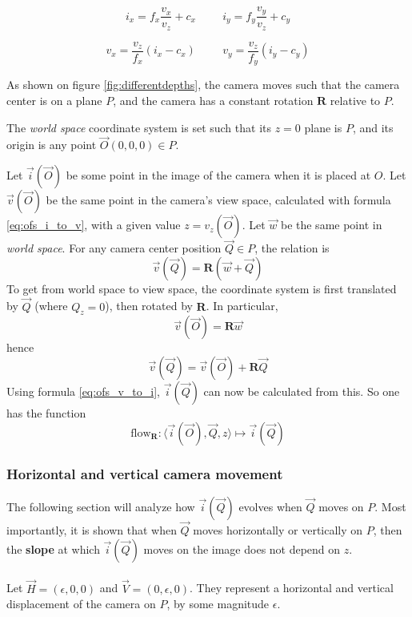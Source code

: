 \documentclass{scrreprt}
\newcommand{\matr}[1]{\mathbf{#1}}
\begin{document}
\begin{equation}
\label{eq:ofs_v_to_i}
i_x = f_x \frac{v_x}{v_z} + c_x
\hspace{1cm}
i_y = f_y \frac{v_y}{v_z} + c_y
\end{equation}

\begin{equation}
\label{eq:ofs_i_to_v}
v_x = \frac{v_z}{f_x} (i_x - c_x)
\hspace{1cm}
v_y = \frac{v_z}{f_y} (i_y - c_y)
\end{equation}

As shown on figure \ref{fig:differentdepths}, the camera moves such that the camera center is on a plane $P$, and the camera has a constant rotation $\matr{R}$ relative to $P$.

The \emph{world space} coordinate system is set such that its $z = 0$ plane is $P$, and its origin is any point $\vec{O}(0,0,0) \in P$.

Let $\vec{i}(\vec{O})$ be some point in the image of the camera when it is placed at $O$. Let $\vec{v}(\vec{O})$ be the same point in the camera's view space, calculated with formula \ref{eq:ofs_i_to_v}, with a given value $z = v_z(\vec{O})$. Let $\vec{w}$ be the same point in \emph{world space}. For any camera center position $\vec{Q} \in P$, the relation is
\begin{equation}
\vec{v}(\vec{Q}) = \matr{R} (\vec{w} + \vec{Q})
\end{equation}
To get from world space to view space, the coordinate system is first translated by $\vec{Q}$ (where $Q_z = 0$), then rotated by $\matr{R}$. In particular,
\begin{equation}
\vec{v}(\vec{O}) = \matr{R} \vec{w}
\end{equation}
hence
\begin{equation}
\vec{v}(\vec{Q}) = \vec{v}(\vec{O}) + \matr{R} \vec{Q}
\end{equation}
Using formula \ref{eq:ofs_v_to_i}, $\vec{i}(\vec{Q})$ can now be calculated from this. So one has the function
\begin{equation}
\text{flow}_{\matr{R}} : \langle \vec{i}(\vec{O}), \vec{Q}, z \rangle \mapsto \vec{i}(\vec{Q})
\end{equation} 

\subsubsection{Horizontal and vertical camera movement}
The following section will analyze how $\vec{i}(\vec{Q})$ evolves when $\vec{Q}$ moves on $P$. Most importantly, it is shown that when $\vec{Q}$ moves horizontally or vertically on $P$, then the \textbf{slope} at which $\vec{i}(\vec{Q})$ moves on the image does not depend on $z$.
\\ \\
Let $\vec{H} = (\epsilon,0,0)$ and $\vec{V} = (0,\epsilon,0)$. They represent a horizontal and vertical displacement of the camera on $P$, by some magnitude $\epsilon$.
\end{document}
